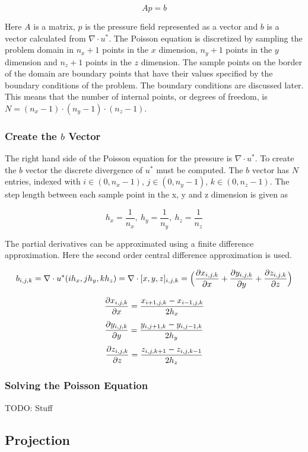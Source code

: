 $$ Ap = b $$

Here $A$ is a matrix, $p$ is the pressure field represented as a vector and $b$
is a vector calculated from $\nabla \cdot u^*$. The Poisson equation is discretized 
by sampling the problem domain in $n_x+1$ points in the $x$ dimension, $n_y+1$
points in the $y$ dimension and $n_z+1$ points in the $z$ dimension. The sample
points on the border of the domain are boundary points that have their values
specified by the boundary conditions of the problem. The boundary conditions
are discussed later. This means that the number of internal points, or degrees of
freedom, is $N = (n_x-1) \cdot (n_y-1) \cdot (n_z-1)$.

\subsubsection{Create the $b$ Vector}

The right hand side of the Poisson equation for the pressure is $\nabla \cdot u^*$.
To create the $b$ vector the discrete divergence of $u^*$ must be computed. The 
$b$ vector has $N$ entries, indexed with $i \in (0, n_x-1)$, $j \in (0, n_y-1)$,
$k \in (0, n_z-1)$. The step length between each sample point in the x, y and z
dimension is given as 

$$ h_x = \frac{1}{n_x}, ~ h_y = \frac{1}{n_y}, ~ h_z = \frac{1}{n_z} $$

The partial derivatives can be approximated using a finite difference approximation. 
Here the second order central difference approximation is used.

$$ b_{i,j,k} = \nabla \cdot u^*(ih_x, jh_y, kh_z) = \nabla \cdot [x, y, z]_{i,j,k} = 
\Big( \frac{\partial x_{i,j,k}}{\partial x} + \frac{\partial y_{i,j,k}}{\partial y} + \frac{\partial z_{i,j,k}}{\partial z} \Big) $$

$$ \frac{\partial x_{i,j,k}}{\partial x} = \frac{x_{i+1,j,k} - x_{i-1,j,k}}{2h_x} $$
$$ \frac{\partial y_{i,j,k}}{\partial y} = \frac{y_{i,j+1,k} - y_{i,j-1,k}}{2h_y} $$
$$ \frac{\partial z_{i,j,k}}{\partial z} = \frac{z_{i,j,k+1} - z_{i,j,k-1}}{2h_z} $$

\subsubsection{Solving the Poisson Equation}

TODO: Stuff

\subsection{Projection}


